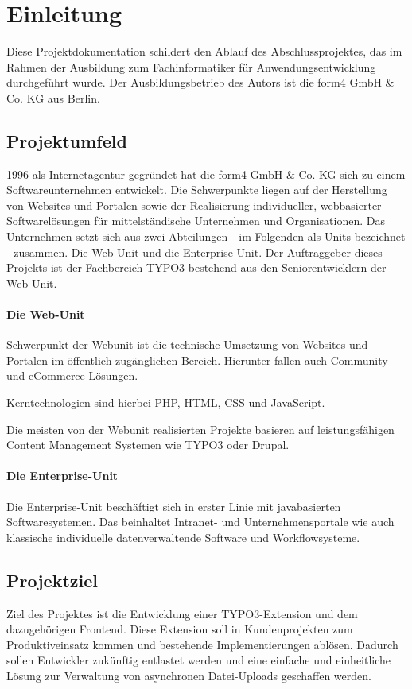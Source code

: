 \section{Einleitung}
\label{sec:Einleitung}
Diese Projektdokumentation schildert den Ablauf des Abschlussprojektes, das im Rahmen der Ausbildung zum Fachinformatiker für Anwendungsentwicklung durchgeführt wurde. Der Ausbildungsbetrieb des Autors ist die form4 GmbH \& Co. KG aus Berlin.

\subsection{Projektumfeld} 
\label{sec:Projektumfeld}
1996 als Internetagentur gegründet hat die form4 GmbH \& Co. KG sich zu einem Softwareunternehmen entwickelt. Die Schwerpunkte liegen auf der Herstellung von Websites und Portalen sowie der Realisierung individueller, webbasierter Softwarelösungen für mittelständische Unternehmen und Organisationen. Das Unternehmen setzt sich aus zwei Abteilungen - im Folgenden als Units bezeichnet - zusammen. Die Web-Unit und die Enterprise-Unit. Der Auftraggeber dieses Projekts ist der Fachbereich TYPO3 bestehend aus den Seniorentwicklern der Web-Unit.

\paragraph{Die Web-Unit}
Schwerpunkt der Webunit ist die technische Umsetzung von Websites und Portalen im öffentlich zugänglichen Bereich. Hierunter fallen auch Community- und eCommerce-Lösungen.

Kerntechnologien sind hierbei PHP, HTML, CSS und JavaScript.

Die meisten von der Webunit realisierten Projekte basieren auf leistungsfähigen Content Management Systemen wie TYPO3 oder Drupal.

\paragraph{Die Enterprise-Unit}
Die Enterprise-Unit beschäftigt sich in erster Linie mit javabasierten Softwaresystemen. Das beinhaltet Intranet- und Unternehmensportale wie auch klassische individuelle datenverwaltende Software und Workflowsysteme.

\subsection{Projektziel} 
\label{sec:Projektziel}
Ziel des Projektes ist die Entwicklung einer TYPO3-Extension und dem dazugehörigen Frontend. Diese Extension soll in Kundenprojekten zum Produktiveinsatz kommen und bestehende Implementierungen ablösen. Dadurch sollen Entwickler zukünftig entlastet werden und eine einfache und einheitliche Lösung zur Verwaltung von asynchronen Datei-Uploads geschaffen werden. 


